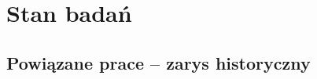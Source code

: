 %
%
%
%
%
%
%
%
%



\chapter{Stan badań}
\label{cha:cha2}

\section{Powiązane prace – zarys historyczny}
